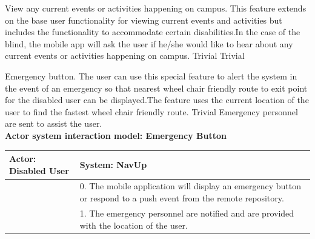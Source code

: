 \FuncReq
{View any current events or activities happening on campus.}
{This feature extends on the base user functionality for viewing current events and activities but includes the functionality to accommodate certain disabilities.In the case of the blind, the mobile app will ask the user if he/she would like to hear about any current events or activities happening on campus.}
{Trivial}
{Trivial}

\FuncReq
{Emergency button.}
{The user can use this special feature to alert the system in the event of an emergency so that nearest wheel chair friendly route to exit point for the disabled user can be displayed.The feature uses the current location of the user to find the fastest wheel chair friendly route.}
{Trivial}
{Emergency personnel are sent to assist the user.}
    \\
    \textbf{Actor system interaction model: Emergency Button}\\
    \begin{tabular}{ | p{6cm} | p{6cm} |}
    \hline
    Actor: Disabled User & System: NavUp \\ \hline
      & 0. The mobile application will display an emergency button or respond to a push event from the remote repository.\\ \hline
      & 1. The emergency personnel are notified and are provided with the location of the user.\\ \hline   
    \end{tabular}
\\
\bigskip
